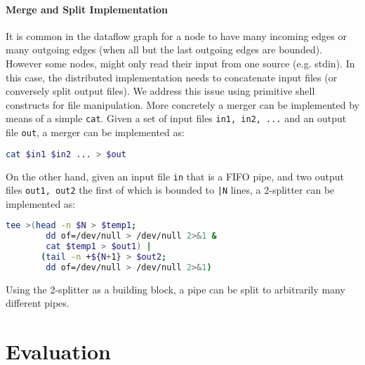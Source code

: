 \documentclass[letterpaper,twocolumn,10pt]{article}
\newcommand{\ttt}[1]{\texttt{\small #1}}
\newcommand{\kk}[1]{[{\color{magenta}#1 --- kk}]}
\newcommand{\tr}[1]{} %
\begin{document}
\paragraph{Merge and Split Implementation}
%
It is common in the dataflow graph for a node to have many incoming
edges or many outgoing edges (when all but the last outgoing edges
are bounded). However some nodes, might only read their input from one
source (e.g. stdin). In this case, the distributed implementation
needs to concatenate input files (or conversely split output
files).
%
%
We address this issue using primitive shell constructs for file
manipulation. More concretely a merger can be implemented by means of a simple
\ttt{cat}. Given a set of input files \ttt{in1, in2, ...} and an
output file \ttt{out}, a merger can be implemented as:

\begin{lstlisting}[language=sh, float=h, numbers=none]
 cat $in1 $in2 ... > $out
\end{lstlisting}

\noindent
On the other hand, given an input file \ttt{in} that is a FIFO pipe,
and two output files \ttt{out1, out2} the first of which is bounded
to \ttt{|N} lines, a 2-splitter can be implemented as:

\begin{lstlisting}[language=sh, float=h, numbers=none]
  tee >(head -n $N > $temp1;
        dd of=/dev/null > /dev/null 2>&1 &
        cat $temp1 > $out1) |
       (tail -n +${N+1} > $out2;
        dd of=/dev/null > /dev/null 2>&1)
\end{lstlisting}

\noindent
Using the 2-splitter as a building block, a pipe can be split to
arbitrarily many different pipes.


\section{Evaluation}
\label{eval}

% 
% 
% 
% 
% 
\end{document}
